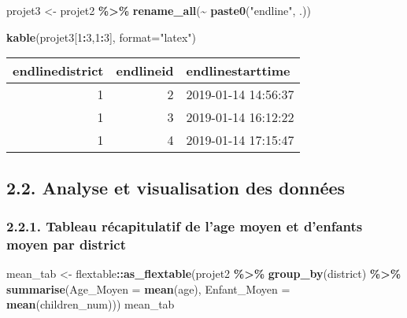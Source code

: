 \documentclass[
]{article}
\newenvironment{Shaded}{\begin{snugshade}}{\end{snugshade}}
\newcommand{\AttributeTok}[1]{\textcolor[rgb]{0.13,0.29,0.53}{#1}}
\newcommand{\DecValTok}[1]{\textcolor[rgb]{0.00,0.00,0.81}{#1}}
\newcommand{\FunctionTok}[1]{\textcolor[rgb]{0.13,0.29,0.53}{\textbf{#1}}}
\newcommand{\NormalTok}[1]{#1}
\newcommand{\OtherTok}[1]{\textcolor[rgb]{0.56,0.35,0.01}{#1}}
\newcommand{\SpecialCharTok}[1]{\textcolor[rgb]{0.81,0.36,0.00}{\textbf{#1}}}
\newcommand{\StringTok}[1]{\textcolor[rgb]{0.31,0.60,0.02}{#1}}
\begin{document}
\begin{Shaded}
\begin{Highlighting}[]
\NormalTok{projet3 }\OtherTok{\textless{}{-}}\NormalTok{ projet2 }\SpecialCharTok{\%\textgreater{}\%} \FunctionTok{rename\_all}\NormalTok{(}\SpecialCharTok{\textasciitilde{}} \FunctionTok{paste0}\NormalTok{(}\StringTok{"endline"}\NormalTok{, .))}

\FunctionTok{kable}\NormalTok{(projet3[}\DecValTok{1}\SpecialCharTok{:}\DecValTok{3}\NormalTok{,}\DecValTok{1}\SpecialCharTok{:}\DecValTok{3}\NormalTok{], }\AttributeTok{format=}\StringTok{"latex"}\NormalTok{)}
\end{Highlighting}
\end{Shaded}

\begin{tabular}{r|r|l}
\hline
endlinedistrict & endlineid & endlinestarttime\\
\hline
1 & 2 & 2019-01-14 14:56:37\\
\hline
1 & 3 & 2019-01-14 16:12:22\\
\hline
1 & 4 & 2019-01-14 17:15:47\\
\hline
\end{tabular}

\hypertarget{analyse-et-visualisation-des-donnuxe9es}{%
\subsection{2.2. Analyse et visualisation des
données}\label{analyse-et-visualisation-des-donnuxe9es}}

\hypertarget{tableau-ruxe9capitulatif-de-lage-moyen-et-denfants-moyen-par-district}{%
\subsubsection{2.2.1. Tableau récapitulatif de l'age moyen et d'enfants
moyen par
district}\label{tableau-ruxe9capitulatif-de-lage-moyen-et-denfants-moyen-par-district}}

\begin{Shaded}
\begin{Highlighting}[]
\NormalTok{mean\_tab }\OtherTok{\textless{}{-}}\NormalTok{ flextable}\SpecialCharTok{::}\FunctionTok{as\_flextable}\NormalTok{(projet2 }\SpecialCharTok{\%\textgreater{}\%} 
          \FunctionTok{group\_by}\NormalTok{(district) }\SpecialCharTok{\%\textgreater{}\%} \FunctionTok{summarise}\NormalTok{(}\AttributeTok{Age\_Moyen =} \FunctionTok{mean}\NormalTok{(age),}
          \AttributeTok{Enfant\_Moyen =} \FunctionTok{mean}\NormalTok{(children\_num)))}
\NormalTok{mean\_tab}
\end{Highlighting}
\end{Shaded}
\end{document}
